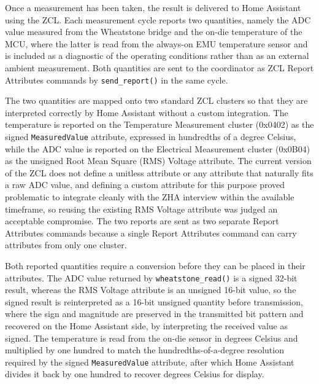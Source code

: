 Once a measurement has been taken, the result is delivered to Home Assistant using the ZCL.
Each measurement cycle reports two quantities, namely the ADC value measured from the Wheatstone bridge and the on-die temperature of the MCU, where the latter is read from the always-on EMU temperature sensor and is included as a diagnostic of the operating conditions rather than as an external ambient measurement.
Both quantities are sent to the coordinator as ZCL Report Attributes commands by \texttt{send\_report()} in the same cycle.

The two quantities are mapped onto two standard ZCL clusters so that they are interpreted correctly by Home Assistant without a custom integration.
The temperature is reported on the Temperature Measurement cluster (0x0402) as the signed \texttt{MeasuredValue} attribute, expressed in hundredths of a degree Celsius, while the ADC value is reported on the Electrical Measurement cluster (0x0B04) as the unsigned Root Mean Square (RMS) Voltage attribute.
The current version of the ZCL does not define a unitless attribute or any attribute that naturally fits a raw ADC value, and defining a custom attribute for this purpose proved problematic to integrate cleanly with the ZHA interview within the available timeframe, so reusing the existing RMS Voltage attribute was judged an acceptable compromise.
The two reports are sent as two separate Report Attributes commands because a single Report Attributes command can carry attributes from only one cluster.

Both reported quantities require a conversion before they can be placed in their attributes.
The ADC value returned by \texttt{wheatstone\_read()} is a signed 32-bit result, whereas the RMS Voltage attribute is an unsigned 16-bit value, so the signed result is reinterpreted as a 16-bit unsigned quantity before transmission, where the sign and magnitude are preserved in the transmitted bit pattern and recovered on the Home Assistant side, by interpreting the received value as signed.
The temperature is read from the on-die sensor in degrees Celsius and multiplied by one hundred to match the hundredths-of-a-degree resolution required by the signed \texttt{MeasuredValue} attribute, after which Home Assistant divides it back by one hundred to recover degrees Celsius for display.

